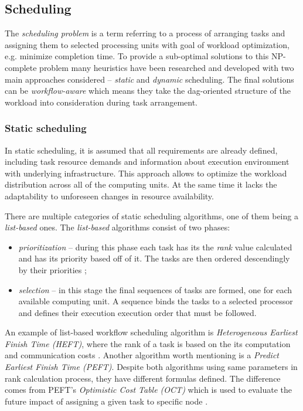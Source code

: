 \subsection{Scheduling}
\label{s:ProblemDomain:Scheduling}

The \emph{scheduling problem} is a term referring to a process of arranging tasks and assigning them to selected processing units with goal of workload optimization, e.g. minimize completion time.
To provide a sub-optimal solutions to this NP-complete problem many heuristics have been researched and developed with two main approaches considered -- \emph{static} and \emph{dynamic} scheduling.
The final solutions can be \emph{workflow-aware} which means they take the dag-oriented structure of the workload into consideration during task arrangement.


\subsubsection{Static scheduling}
\label{s:ProblemDomain:StaticSched}

In static scheduling, it is assumed that all requirements are already defined, including task resource demands and information about execution environment with underlying infrastructure.
This approach allows to optimize the workload distribution across all of the computing units.
At the same time it lacks the adaptability to unforeseen changes in resource availability. 


There are multiple categories of static scheduling algorithms, one of them being a \emph{list-based} ones.
The \emph{list-based} algorithms consist of two phases:


\begin{itemize}
  \item{
\emph{prioritization} -- during this phase each task has its the \emph{rank} value calculated and has its priority based off of it. The tasks are then ordered descendingly by their priorities
};
  \item{
\emph{selection} -- in this stage the final sequences of tasks are formed, one for each available computing unit. A sequence binds the tasks to a selected processor and defines their execution execution order that must be followed.
}
\end{itemize}


An example of list-based workflow scheduling algorithm is \emph{Heterogeneous Earliest Finish Time (HEFT)}, where the rank of a task is based on the its computation and communication costs \cite{b:HEFT}.
Another algorithm worth mentioning is a \emph{Predict Earliest Finish Time (PEFT)}.
Despite both algorithms using same parameters in rank calculation process, they have different formulas defined.
The difference comes from PEFT's \emph{Optimistic Cost Table (OCT)} which is used to evaluate the future impact of assigning a given task to specific node \cite{b:PEFT}. 



